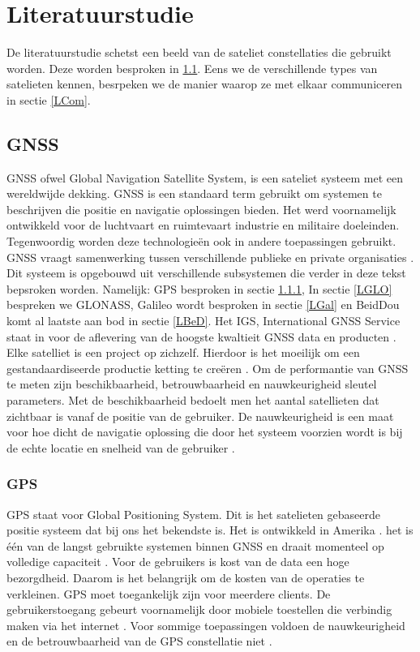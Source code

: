 \chapter{Literatuurstudie}
De literatuurstudie schetst een beeld van de sateliet constellaties die gebruikt worden. Deze worden besproken in \ref{LGNS}. Eens we de verschillende types van satelieten kennen, besrpeken we de manier waarop ze met elkaar communiceren in sectie \ref{LCom}.

\section{GNSS}
\label{LGNS}
GNSS ofwel Global Navigation Satellite System, is een sateliet systeem met een wereldwijde dekking. GNSS is een standaard term gebruikt om systemen te beschrijven die positie en navigatie oplossingen bieden. Het werd voornamelijk ontwikkeld voor de luchtvaart en ruimtevaart industrie en militaire doeleinden. Tegenwoordig worden deze technologie\"en ook in andere toepassingen gebruikt. GNSS vraagt samenwerking tussen verschillende publieke en private organisaties \cite{LBibGNSS3}.  Dit systeem is opgebouwd uit verschillende subsystemen die verder in deze tekst bepsroken worden. Namelijk: GPS besproken in sectie \ref{LGPS}, In sectie \ref{LGLO} bespreken we GLONASS, Galileo wordt besproken in sectie \ref{LGal} en BeidDou komt al laatste aan bod in sectie \ref{LBeD}. Het IGS, International GNSS Service staat in voor de aflevering van de hoogste kwaltieit GNSS data en producten \cite{LBibGNSS}. Elke satelliet is een project op zichzelf. Hierdoor is het moeilijk om een gestandaardiseerde productie ketting te creëren \cite{LBibGNSS3}. Om de performantie van GNSS te meten zijn beschikbaarheid, betrouwbaarheid en nauwkeurigheid sleutel parameters. Met de beschikbaarheid bedoelt men het aantal satellieten dat zichtbaar is vanaf de positie van de gebruiker. De nauwkeurigheid is een maat voor hoe dicht de navigatie oplossing die door het systeem voorzien wordt is bij de echte locatie en snelheid van de gebruiker \cite{LBibGNSS6}.

\subsection{GPS}
\label{LGPS} 
GPS staat voor Global Positioning System. Dit is het satelieten gebaseerde positie systeem dat bij ons het bekendste is. Het is ontwikkeld in Amerika \cite{LBibGNSS}\cite{LBibGNSS3}. het is \'e\'en van de langst gebruikte systemen binnen GNSS en draait momenteel op volledige capaciteit \cite{LBibGNSS4}. Voor de gebruikers is kost van de data een hoge bezorgdheid. Daarom is het belangrijk om de kosten van de operaties te verkleinen. GPS moet toegankelijk zijn voor meerdere clients. De gebruikerstoegang gebeurt voornamelijk door mobiele toestellen die verbindig maken via het internet \cite{LBibGPS}. Voor sommige toepassingen voldoen de nauwkeurigheid en de betrouwbaarheid van de GPS constellatie niet \cite{LBibGNSS6}.

